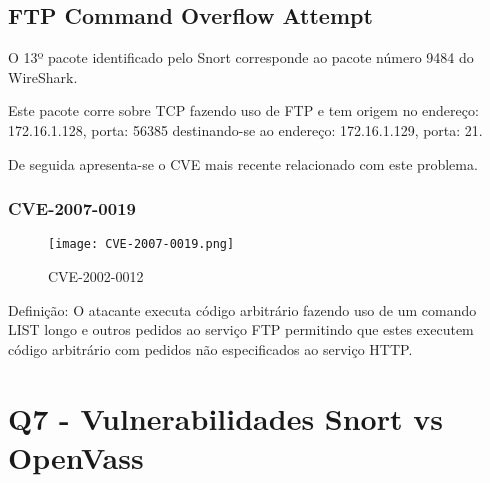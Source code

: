 \subsection{FTP Command Overflow Attempt}

\par O 13º pacote identificado pelo Snort corresponde ao pacote número 9484 do WireShark.
\par Este pacote corre sobre TCP fazendo uso de FTP e tem origem no endereço: 172.16.1.128, porta: 56385 destinando-se ao endereço: 172.16.1.129, porta: 21.
\par De seguida apresenta-se o CVE mais recente relacionado com este problema.

\subsubsection{CVE-2007-0019}

\begin{figure}[H]

  \centering

  \texttt{[image: CVE-2007-0019.png]}

  \caption {CVE-2002-0012}

  \label {fig2}

\end{figure}

\par Definição: O atacante executa código arbitrário fazendo uso de um comando LIST longo e outros pedidos ao serviço FTP permitindo que estes executem código arbitrário com pedidos não especificados ao serviço HTTP.



\section{Q7 - Vulnerabilidades Snort vs OpenVass}

